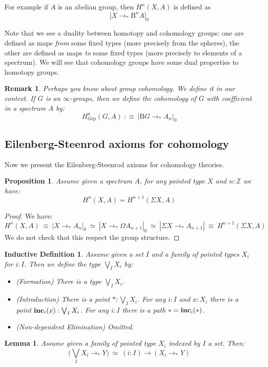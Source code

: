 \documentclass{article}
\newcommand{\sse}[1]{\medbreak \subsection{#1}}
\renewcommand{\r}{\rightarrow}
\newcommand{\Grp}{\mathrm{Grp}}
\newcommand{\B}{\mathrm{B}}
\newtheorem{lemma}{Lemma}
\newtheorem{proposition}{Proposition}
\newtheorem{remark}{Remark}
\newtheorem{ind_def}{Inductive Definition}
\begin{document}
For example if $A$ is an abelian group, then $H^n(X,A)$ is defined as
\[|X\r_* \B^n A|_0\]

Note that we see a duality between homotopy and cohomology groups: one are defined as maps \emph{from} some fixed types (more precisely from the spheres), the other are defined as maps \emph{to} some fixed types (more precisely to elements of a spectrum). We will see that cohomology groups have some dual properties to homotopy groups. 

\begin{remark}
Perhaps you know about group cohomology. We define it in our context. If $G$ is an $\infty$-groups, then we define the cohomology of $G$ with coefficient in a spectrum $A$ by:
\[H^n_\Grp(G,A) \ :\equiv\ |\B G \r_* A_n|_0\]
\end{remark}


\sse{Eilenberg-Steenrod axioms for cohomology}

Now we present the Eilenberg-Steenrod axioms for cohomology theories.

\begin{proposition}
Assume given a spectrum $A$, for any pointed type $X$ and $n:\mathbb{Z}$ we have:
\[H^n(X,A) = H^{n+1}(\Sigma X,A)\]
\end{proposition}
\begin{proof}
We have:
\[H^n(X,A) \ \equiv\ |X\r_* A_n|_0 \ \simeq \ |X\r_*\Omega A_{n+1}|_0 \ \simeq \ |\Sigma X \r_* A_{n+1}| \ \equiv\ H^{n+1}(\Sigma X , A)\]
We do not check that this respect the group structure.
\end{proof}

\begin{ind_def}
Assume given a set $I$ and a family of pointed types $X_i$ for $i:I$. Then we define the type $\bigvee_I X_i$ by:
\begin{itemize}
\item (Formation) There is a type $\bigvee_I X_i$.
\item (Introduction) There is a point $*:\bigvee_I X_i$.
For any $i:I$ and $x:X_i$ there is a point $\mathrm{\bf inc}_i(x) : \bigvee_I X_i$.
For any $i:I$ there is a path $* = \mathrm{\bf inc}_i(*)$.
\item (Non-dependent Elimination) Omitted.
\end{itemize} 
\end{ind_def}

\begin{lemma}
Assume given a family of pointed type $X_i$ indexed by $I$ a set. Then:
\[\big(\bigvee_I X_i \r_* Y\big) \ \simeq\ (i:I) \r (X_i\r_* Y)\]
\end{lemma}
\end{document}
